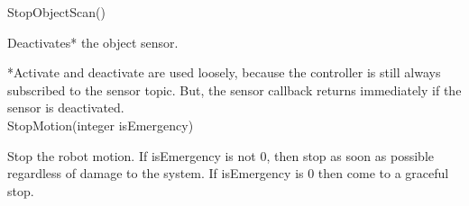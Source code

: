 \sf StopObjectScan()\rm

Deactivates* the object sensor.

*Activate and deactivate are used loosely, because the controller is
still always subscribed to the sensor topic. But, the sensor callback 
returns immediately if the sensor is deactivated.\\

\sf StopMotion(integer isEmergency)\rm

Stop the robot motion. If \sf isEmergency \rm is not 0, then stop as soon
as possible regardless of damage to the system. If \sf isEmergency \rm is 0
then come to a graceful stop.\\
